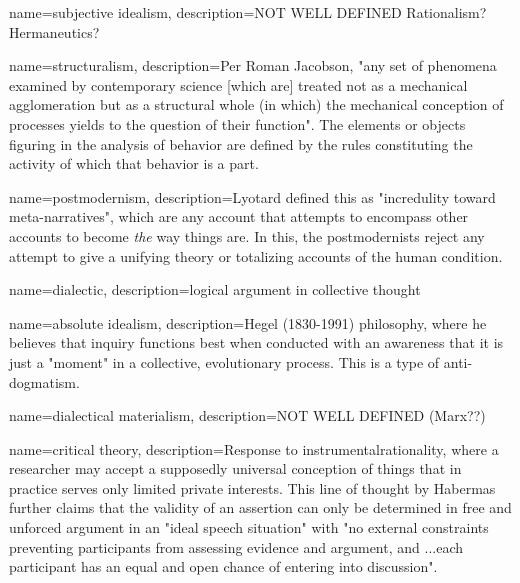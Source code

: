 {
	name={subjective idealism},
	description={NOT WELL DEFINED Rationalism? Hermaneutics? \parencite{bredo_philosophies_2006}}
}


{
	name={structuralism},
	description={Per Roman Jacobson, "any set of phenomena examined by contemporary science [which are] treated not as a mechanical agglomeration but as a structural whole (in which) the mechanical conception of processes yields to the question of their function". The elements or objects figuring in the analysis of behavior are defined by the rules constituting the activity of which that behavior is a part.  \parencite{bredo_philosophies_2006}}
}


{
	name={postmodernism},
	description={Lyotard defined this as "incredulity toward meta-narratives", which are any account that attempts to encompass other accounts to become \emph{the} way things are. In this, the postmodernists reject any attempt to give a unifying theory or totalizing accounts of the human condition.  \parencite{bredo_philosophies_2006}}
}


{
	name={dialectic},
	description={logical argument in collective thought \parencite{bredo_philosophies_2006}}
}

{
	name={absolute idealism},
	description={Hegel (1830-1991) philosophy, where he believes that inquiry functions best when conducted with an awareness that it is just a "moment" in a collective, evolutionary process. This is a type of anti-dogmatism. \parencite{bredo_philosophies_2006}}
}


{
	name={dialectical materialism},
	description={NOT WELL DEFINED (Marx??) \parencite{bredo_philosophies_2006}}
} 
 
 
{
	name={critical theory},
	description={Response to \gls{instrumentalrationality}, where a researcher may accept a supposedly universal conception of things that in practice serves only limited private interests. This line of thought by Habermas further claims that the validity of an assertion can only be determined in free and unforced argument in an "ideal speech situation" with "no external constraints preventing participants from assessing evidence and argument, and ...each participant has an equal and open chance of entering into discussion". \parencite{bredo_philosophies_2006}}
}

